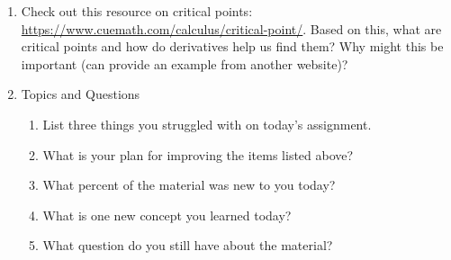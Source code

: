\documentclass[12pt,thmsa]{article}
\begin{document}
\begin{enumerate}
\item Check out this resource on critical points: 
\url{https://www.cuemath.com/calculus/critical-point/}. Based on this, what are critical points and how do derivatives help us find them? Why might this be important (can provide an example from another website)? 



\item Topics and Questions
    \begin{enumerate}
        \item List three things you struggled with on today's assignment. 
        \item What is your plan for improving the items listed above?
        \item What percent of the material was new to you today?
        \item What is one new concept you learned today?
        \item What question do you still have about the material?
    \end{enumerate}


\end{enumerate}
\end{document}
